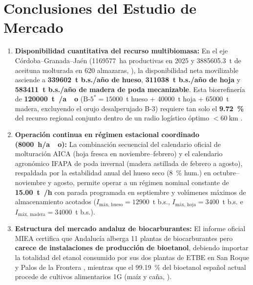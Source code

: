 \documentclass{report}
\begin{document}
\chapter{Conclusiones del Estudio de Mercado}

\begin{enumerate}
    \item \textbf{Disponibilidad cuantitativa del recurso multibiomasa:} En el eje Córdoba--Granada--Jaén (\num{1169577}~ha productivas en 2025 y \num{3885605.3}~t de aceituna molturada en 620 almazaras, \textcite{MAPA2025, AICA2026}), la disponibilidad neta movilizable asciende a \textbf{\num{339602}~t b.s./año de hueso}, \textbf{\num{311038}~t b.s./año de hoja} y \textbf{\num{583411}~t b.s./año de madera de poda mecanizable}. Esta biorrefinería de \textbf{\SI{120000}{\tonne{}/ao}} ($\text{B-5}^* = \num{15000}$~t hueso + \num{40000}~t hoja + \num{65000}~t madera, excluyendo el orujo desalperujado B-3) requiere tan solo el \textbf{\SI{9.72}{\percent}} del recurso regional conjunto dentro de un radio logístico óptimo $< \SI{60}{\kilo\meter}$ \autocite{Ronda2027}.
    \item \textbf{Operación continua en régimen estacional coordinado (\SI{8000}{\hour/ao}):} La combinación secuencial del calendario oficial de molturación AICA (hoja fresca en noviembre--febrero) y el calendario agronómico IFAPA de poda invernal (madera astillada de febrero a agosto), respaldada por la estabilidad anual del hueso seco (\SI{8}{\percent} hum.) en octubre--noviembre y agosto, permite operar a un régimen nominal constante de \textbf{\SI{15.00}{\tonne{}/\hour}} con parada programada en septiembre y volúmenes máximos de almacenamiento acotados ($I_{\text{máx, hueso}} = \num{12900}$~t b.s., $I_{\text{máx, hoja}} = \num{3400}$~t b.s. e $I_{\text{máx, madera}} = \num{34000}$~t b.s.).
    \item \textbf{Estructura del mercado andaluz de biocarburantes:} El informe oficial MIEA certifica que Andalucía alberga 11 plantas de biocarburantes pero \textbf{carece de instalaciones de producción de bioetanol}, debiendo importar la totalidad del etanol consumido por sus dos plantas de ETBE en San Roque y Palos de la Frontera \autocite[Sección~7, Nota~4]{AAE2026}, mientras que el \SI{99.19}{\percent} del bioetanol español actual procede de cultivos alimentarios 1G (maíz y caña, \textcite[Hoja~\texttt{Sost\_Tipo MP\_Bioet}]{MITECO2026}).

\end{enumerate}
\end{document}
